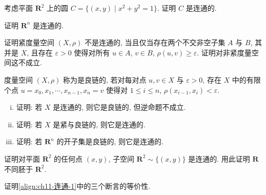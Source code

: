 \documentclass[../../main.tex]{subfiles}
\begin{document}
\begin{exercise}\label{exercise:ch11-51}
考虑平面 $\mathbf{R}^{2}$ 上的圆 $C=\{(x,y)\mid x^{2}+y^{2}=1\}$. 证明 $C$ 是连通的.
\end{exercise}

\begin{exercise}\label{exercise:ch11-52}
证明 $\mathbf{R}^{n}$ 是连通的.
\end{exercise}

\begin{exercise}\label{exercise:ch11-53}
证明紧度量空间 $(X,\rho)$ 不是连通的, 当且仅当存在两个不交非空子集 $A$ 与 $B$, 其并是 $X$, 且存在 $\varepsilon>0$ 使得对所有 $u\in A$, $v\in B$, $\rho(u,v)\geqslant\varepsilon$. 证明对非紧度量空间这不成立.
\end{exercise}

\begin{exercise}\label{exercise:ch11-54}
度量空间 $(X,\rho)$ 称为是良链的, 若对每对点 $u,v\in X$ 与 $\varepsilon>0$, 存在 $X$ 中的有限个点 $u=x_{0},x_{1},\cdots,x_{n-1},x_{n}=v$ 使得对 $1\leqslant i\leqslant n$, $\rho(x_{i-1},x_{i})<\varepsilon$.
\begin{enumerate}[(i)]
\item 证明: 若 $X$ 是连通的, 则它是良链的, 但逆命题不成立.
\item 证明: 若 $X$ 是紧与良链的, 则它是连通的.
\item 证明: 若 $\mathbf{R}^{n}$ 的开子集是良链的, 则它是连通的.
\end{enumerate}
\end{exercise}

\begin{exercise}\label{exercise:ch11-55}
证明对平面 $\mathbf{R}^{2}$ 的任何点 $(x,y)$, 子空间 $\mathbf{R}^{2}\sim\{(x,y)\}$ 是连通的. 用此证明 $\mathbf{R}$ 不同胚于 $\mathbf{R}^{2}$.
\end{exercise}

\begin{exercise}\label{exercise:ch11-56}
证明\eqref{align:ch11-连通-1}中的三个断言的等价性.
\end{exercise}
\end{document}
